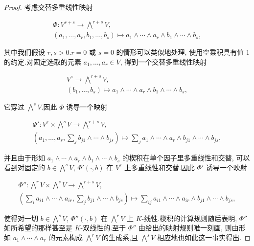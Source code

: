 \begin{proof}
考虑交替多重线性映射

\[
\begin{array}{c}
\Phi \colon V^{r + s} \longrightarrow \bigwedge^{r + s} V, \\
(a_1, \ldots, a_r, b_1, \ldots, b_s) \longmapsto a_1 \wedge \cdots \wedge a_r \wedge b_1 \wedge \cdots \wedge b_s,
\end{array}
\]

其中我们假设 $r, s > 0$.$r = 0$ 或 $s = 0$ 的情形可以类似地处理, 使用空乘积具有值 $1$ 的约定.对固定选取的元素 $a_1, \ldots, a_r \in V$, 得到一个交替多重线性映射

\[
\begin{array}{c}
V^s \longrightarrow \bigwedge^{r + s} V, \\
(b_1, \ldots, b_s) \longmapsto a_1 \wedge \cdots \wedge a_r \wedge b_1 \wedge \cdots \wedge b_s,
\end{array}
\]

它穿过 $\bigwedge^s V$.因此 $\Phi$ 诱导一个映射

\[
\begin{array}{c}
\Phi' \colon V^r \times \bigwedge^s V \longrightarrow \bigwedge^{r + s} V, \\
\left(a_1, \ldots, a_r, \sum_{j} b_{j1} \wedge \cdots \wedge b_{js}\right) \longmapsto \sum_{j} a_1 \wedge \cdots \wedge a_r \wedge b_{j1} \wedge \cdots \wedge b_{js},
\end{array}
\]

并且由于形如 $a_1 \wedge \cdots \wedge a_r \wedge b_1 \wedge \cdots \wedge b_s$ 的楔积在单个因子里多重线性和交替, 可以看到对固定的 $b \in \bigwedge^s V$, $\Phi'(\cdot, b)$ 在 $V^r$ 上多重线性和交替.因此 $\Phi'$ 诱导一个映射

\[
\begin{array}{c}
\Phi'' \colon \bigwedge^r V \times \bigwedge^s V \longrightarrow \bigwedge^{r + s} V, \\
\left(\sum_{i} a_{i1} \wedge \cdots \wedge a_{ir}, \sum_{j} b_{j1} \wedge \cdots \wedge b_{js}\right) \longmapsto \sum_{i j} a_{i1} \wedge \cdots \wedge a_{ir} \wedge b_{j1} \wedge \cdots \wedge b_{js},
\end{array}
\]

使得对一切 $b \in \bigwedge^s V$, $\Phi''(\cdot, b)$ 在 $\bigwedge^r V$ 上 $K$-线性.楔积的计算规则随后表明, $\Phi''$ 如所希望的那样甚至是 $K$-双线性的.至于 $\Phi''$ 由给出的映射规则唯一刻画, 则由形如 $a_1 \wedge \cdots \wedge a_r$ 的元素构成 $\bigwedge^r V$ 的生成系,且 $\bigwedge^s V$ 相应地也如此这一事实得出.
\end{proof}

